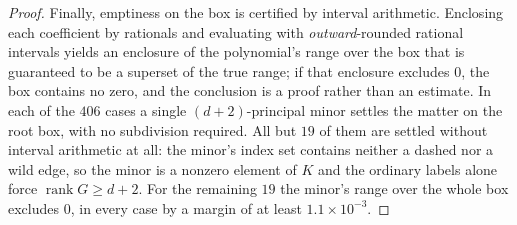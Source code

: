 \documentclass[10pt,a4paper]{amsart}
\DeclareMathOperator{\rank}{rank}
\newcommand{\Gr}{G}
\newcommand{\NumWild}{406}
\newcommand{\WildMinMargin}{1.1\times10^{-3}}
\newcommand{\WildRootBox}{19}
\begin{document}
\begin{proof}
Finally, emptiness on the box is certified by interval arithmetic. Enclosing each
coefficient by rationals and evaluating with \emph{outward}-rounded rational
intervals yields an enclosure of the polynomial's range over the box that is
guaranteed to be a superset of the true range; if that enclosure excludes $0$, the
box contains no zero, and the conclusion is a proof rather than an estimate. In
each of the $\NumWild$ cases a single $(d+2)$-principal minor settles the matter on
the root box, with no subdivision required. All but $\WildRootBox$ of them are
settled without interval arithmetic at all: the minor's index set contains neither a
dashed nor a wild edge, so the minor is a nonzero element of $K$ and the ordinary
labels alone force $\rank\Gr\ge d+2$. For the remaining $\WildRootBox$ the minor's
range over the whole box excludes $0$, in every case by a margin of at least
$\WildMinMargin$.
\end{proof}
\end{document}
